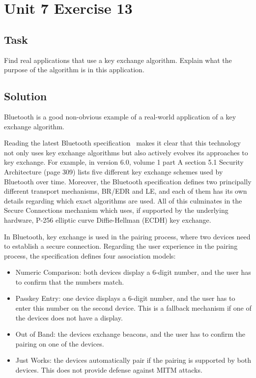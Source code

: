\section{Unit 7 Exercise 13}

\subsection{Task}
Find real applications that use a key exchange algorithm.
Explain what the purpose of the algorithm is in this application.

\subsection{Solution}

Bluetooth is a good non-obvious example of a real-world application of a key exchange algorithm.

Reading the latest Bluetooth specification~\cite{bluetooth} makes it clear that this technology not only uses key exchange algorithms but also actively evolves its approaches to key exchange.
For example, in version 6.0, volume 1 part A section 5.1 Security Architecture (page 309) lists five different key exchange schemes used by Bluetooth over time.
Moreover, the Bluetooth specification defines two principally different transport mechanisms, BR/EDR and LE, and each of them has its own details regarding which exact algorithms are used.
All of this culminates in the Secure Connections mechanism which uses, if supported by the underlying hardware, P-256 elliptic curve Diffie-Hellman (ECDH) key exchange.

In Bluetooth, key exchange is used in the pairing process, where two devices need to establish a secure connection.
Regarding the user experience in the pairing process, the specification defines four association models:
\begin{itemize}
    \item Numeric Comparison: both devices display a 6-digit number, and the user has to confirm that the numbers match.
    \item Passkey Entry: one device displays a 6-digit number, and the user has to enter this number on the second device. This is a fallback mechanism if one of the devices does not have a display.
    \item Out of Band: the devices exchange beacons, and the user has to confirm the pairing on one of the devices.
    \item Just Works: the devices automatically pair if the pairing is supported by both devices. This does not provide defense against MITM attacks.
\end{itemize}

